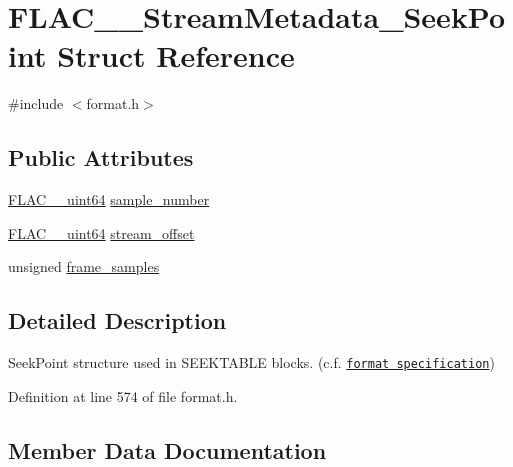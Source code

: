 \hypertarget{struct_f_l_a_c_____stream_metadata___seek_point}{}\section{F\+L\+A\+C\+\_\+\+\_\+\+Stream\+Metadata\+\_\+\+Seek\+Point Struct Reference}
\label{struct_f_l_a_c_____stream_metadata___seek_point}


{\ttfamily \#include $<$format.\+h$>$}

\subsection*{Public Attributes}
\begin{DoxyCompactItemize}
\item 
\hyperlink{ordinals_8h_aa78c8c70a3eb8a58af7436f278acde8e}{F\+L\+A\+C\+\_\+\+\_\+uint64} \hyperlink{struct_f_l_a_c_____stream_metadata___seek_point_a96a62923f1443fd3a5a3498e701e6ecf}{sample\+\_\+number}
\item 
\hyperlink{ordinals_8h_aa78c8c70a3eb8a58af7436f278acde8e}{F\+L\+A\+C\+\_\+\+\_\+uint64} \hyperlink{struct_f_l_a_c_____stream_metadata___seek_point_a6028398e99f937b002618af677d32c9f}{stream\+\_\+offset}
\item 
unsigned \hyperlink{struct_f_l_a_c_____stream_metadata___seek_point_a247ce3f0d45a56c202e623742309fe61}{frame\+\_\+samples}
\end{DoxyCompactItemize}


\subsection{Detailed Description}
Seek\+Point structure used in S\+E\+E\+K\+T\+A\+B\+LE blocks. (c.\+f. \href{../format.html#seekpoint}{\tt format specification}) 

Definition at line 574 of file format.\+h.



\subsection{Member Data Documentation}

